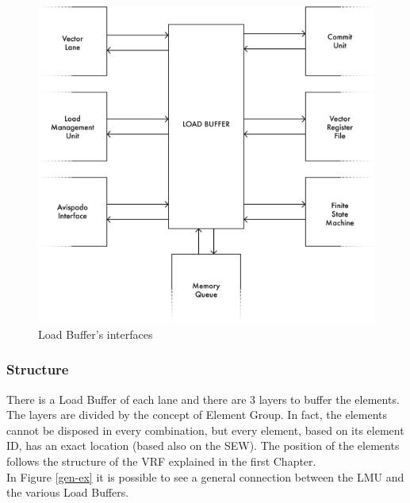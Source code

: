 \begin{figure}[H]
    \centering
    \includegraphics[scale = 0.6]{Chapter_2/img/lb-if.png}
    \caption{Load Buffer's interfaces}
    \label{lb-if}
\end{figure}

\subsubsection{Structure}
There is a Load Buffer of each lane and there are 3 layers to buffer the elements. The layers are divided by the concept of Element Group. In fact, the elements cannot be disposed in every combination, but every element, based on its element ID, has an exact location (based also on the SEW). The position  of the elements follows the structure of the VRF explained in the first Chapter.\\

In Figure \ref{gen-ex} it is possible to see a general connection between the LMU and the various Load Buffers.\\

